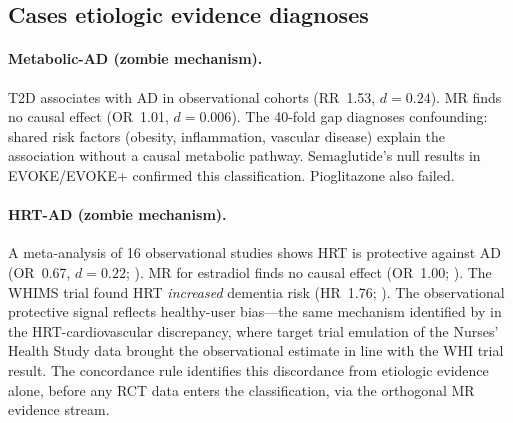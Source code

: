 \documentclass[11pt]{article}
\begin{document}
\subsection{Cases etiologic evidence diagnoses}

\paragraph{Metabolic-AD (zombie mechanism).} T2D associates with AD in observational cohorts (RR~1.53, $d = 0.24$). MR finds no causal effect (OR~1.01, $d = 0.006$). The 40-fold gap diagnoses confounding: shared risk factors (obesity, inflammation, vascular disease) explain the association without a causal metabolic pathway. Semaglutide's null results in EVOKE/EVOKE+ confirmed this classification. Pioglitazone also failed.

\paragraph{HRT-AD (zombie mechanism).} A meta-analysis of 16 observational studies shows HRT is protective against AD (OR~0.67, $d = 0.22$; \cite{song2020}). MR for estradiol finds no causal effect (OR~1.00; \cite{barth2025}). The WHIMS trial found HRT \emph{increased} dementia risk (HR~1.76; \cite{shumaker2003}). The observational protective signal reflects healthy-user bias---the same mechanism identified by \citet{hernan2008} in the HRT-cardiovascular discrepancy, where target trial emulation of the Nurses' Health Study data brought the observational estimate in line with the WHI trial result. The concordance rule identifies this discordance from etiologic evidence alone, before any RCT data enters the classification, via the orthogonal MR evidence stream.
\end{document}
